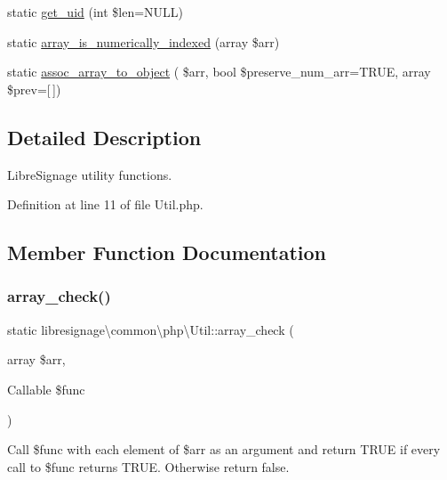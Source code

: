 \begin{DoxyCompactItemize}
\item 
static \hyperlink{classlibresignage_1_1common_1_1php_1_1Util_a32b77dcda1e1aebea31b66741463e62d}{get\+\_\+uid} (int \$len=N\+U\+LL)
\item 
static \hyperlink{classlibresignage_1_1common_1_1php_1_1Util_a6474a3d974f7fa57cfcb698b9f240c83}{array\+\_\+is\+\_\+numerically\+\_\+indexed} (array \$arr)
\item 
static \hyperlink{classlibresignage_1_1common_1_1php_1_1Util_ab0c3cbafd3821c6120d6f6941b17d6c4}{assoc\+\_\+array\+\_\+to\+\_\+object} ( \$arr, bool \$preserve\+\_\+num\+\_\+arr=T\+R\+UE, array \$prev=\mbox{[}$\,$\mbox{]})
\end{DoxyCompactItemize}


\subsection{Detailed Description}
Libre\+Signage utility functions. 

Definition at line 11 of file Util.\+php.



\subsection{Member Function Documentation}
\mbox{\label{classlibresignage_1_1common_1_1php_1_1Util_ac5b8dc6b78eb2b1bf9a8b343cdfa38eb}} 
\subsubsection{\texorpdfstring{array\+\_\+check()}{array\_check()}}
{\footnotesize\ttfamily static libresignage\textbackslash{}common\textbackslash{}php\textbackslash{}\+Util\+::array\+\_\+check (\begin{DoxyParamCaption}\item[{array}]{\$arr,  }\item[{Callable}]{\$func }\end{DoxyParamCaption})\hspace{0.3cm}{\ttfamily [static]}}

Call \$func with each element of \$arr as an argument and return T\+R\+UE if every call to \$func returns T\+R\+UE. Otherwise return false.


